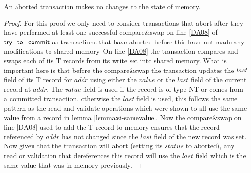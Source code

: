 \begin{lemma}
\label{lemma:si-abort}
An aborted transaction makes no changes to the state of memory.
\end{lemma}
\begin{proof}
For this proof we only need to consider transactions that abort after they have performed
at least one successful compare\&swap on line \ref{DA08} of $\sf{try\_to\_commit}$ as transactions
that have aborted before this have not made any modifications to shared memory.
On line \ref{DA08} the transaction compares and swaps each of its T records from its write set into
shared memory.
What is important here is that before the compare\&swap the transaction updates the $\ms{last}$
field of its T record for $\mathit{addr}$ using either the $\mathit{value}$ or the $\mathit{last}$ field of the current
record at $\mathit{addr}$.
The $\mathit{value}$ field is used if the record is of type NT or comes from a committed transaction, otherwise the $\mathit{last}$
field is used, this follows the same pattern as the read and validate operations which were shown to all use the same value
from a record in lemma \ref{lemma:si-samevalue}.
Now the compare\&swap on line \ref{DA08} used to add the T record to memory ensures that the record referenced by $\mathit{addr}$ has not
changed since the $\mathit{last}$ field of the new record was set.
Now given that the transaction will abort (setting its $\mathit{status}$ to aborted), any read or validation that dereferences
this record will use the $\mathit{last}$ field which is the same value that was in memory previously.
\end{proof}



